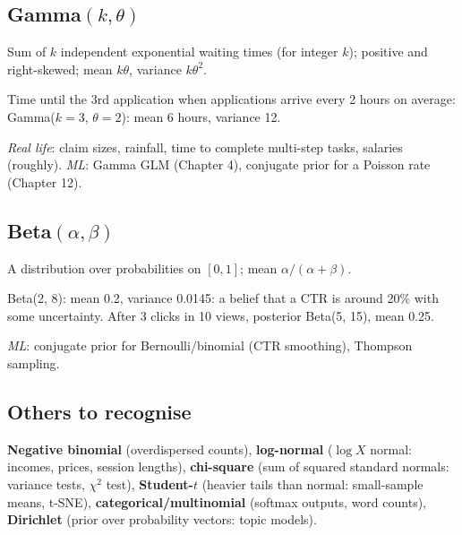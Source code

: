 \subsection{Gamma$(k,\theta)$}
Sum of $k$ independent exponential waiting times (for integer $k$); positive and right-skewed; mean $k\theta$, variance $k\theta^2$.
\begin{example}[: gamma]
Time until the 3rd application when applications arrive every 2 hours on average: Gamma($k = 3$, $\theta = 2$): mean 6 hours, variance 12.
\end{example}
\emph{Real life}: claim sizes, rainfall, time to complete multi-step tasks, salaries (roughly). \emph{ML}: Gamma GLM (Chapter 4), conjugate prior for a Poisson rate (Chapter 12).

\subsection{Beta$(\alpha,\beta)$}
A distribution over probabilities on $[0,1]$; mean $\alpha/(\alpha+\beta)$.
\begin{example}[: beta]
Beta(2, 8): mean 0.2, variance 0.0145: a belief that a CTR is around 20\% with some uncertainty. After 3 clicks in 10 views, posterior Beta(5, 15), mean 0.25.
\end{example}
\emph{ML}: conjugate prior for Bernoulli/binomial (CTR smoothing), Thompson sampling.

\subsection{Others to recognise}
\textbf{Negative binomial} (overdispersed counts), \textbf{log-normal} ($\log X$ normal: incomes, prices, session lengths), \textbf{chi-square} (sum of squared standard
normals: variance tests, $\chi^2$ test), \textbf{Student-$t$} (heavier tails than normal: small-sample means, t-SNE), \textbf{categorical/multinomial} (softmax outputs, word counts),
\textbf{Dirichlet} (prior over probability vectors: topic models).

